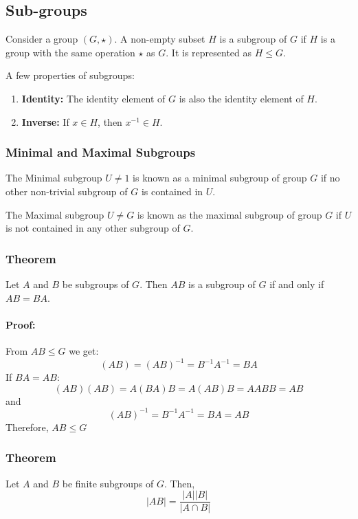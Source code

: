 \documentclass[12pt, oneside]{book}
\begin{document}
\subsection{Sub-groups}
Consider a group \( \left(G, \star \right) \).
A non-empty subset \(H\) is a subgroup of \(G\) if \(H\) is a group with the same operation \(\star\) as \(G\).
It is represented as \(H \leq G\).

A few properties of subgroups:
\begin{enumerate}
    \item \textbf{Identity:} The identity element of \(G\) is also the identity element of \(H\).
    \item \textbf{Inverse:} If \(x \in H\), then \(x^{-1} \in H\).
\end{enumerate}

\subsubsection{Minimal and Maximal Subgroups}
The Minimal subgroup \(U \neq 1\) is known as a minimal subgroup of group \(G\) if no other non-trivial subgroup of \(G\) is contained in \(U\).

The Maximal subgroup \(U \neq G\) is known as the maximal subgroup of group \(G\) if \(U\) is not contained in any other subgroup of \(G\).

\subsubsection{Theorem}
Let \(A\) and \(B\) be subgroups of \(G\).
Then \(AB\) is a subgroup of \(G\) if and only if \(AB=BA\).

\paragraph{Proof:} From \( AB \leq G \) we get:
\[ \left(AB \right) = \left(AB\right)^{-1} = B^{-1} A^{-1} = BA \]
If \(BA = AB\):
\[\left(AB\right) \left(AB\right) = A\left(BA\right) B = A\left(AB\right)B = AABB = AB \]
and
\[ \left(AB\right)^{-1} = B^{-1} A^{-1} = BA = AB\] 
Therefore, \(AB \leq G\)

\subsubsection{Theorem}
Let \(A\) and \(B\) be finite subgroups of \(G\).
Then, \[ \left| AB \right| = \frac{ \left| A \right| \left| B \right|}{\left| A \cap B \right|} \]
\end{document}
